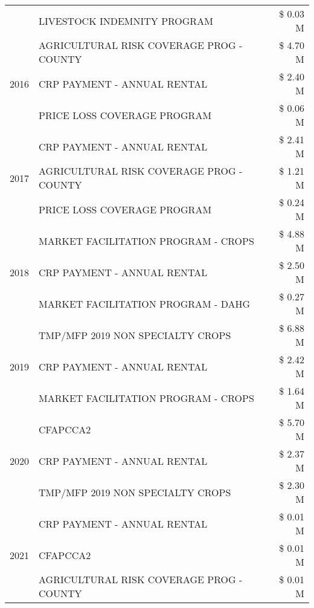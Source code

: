 \begin{tabular}{llr}
 & LIVESTOCK INDEMNITY PROGRAM & \$ 0.03 M \\
\cline{1-3}
\multirow[t]{3}{*}{2016} & AGRICULTURAL RISK COVERAGE PROG - COUNTY & \$ 4.70 M \\
 & CRP PAYMENT - ANNUAL RENTAL & \$ 2.40 M \\
 & PRICE LOSS COVERAGE PROGRAM & \$ 0.06 M \\
\cline{1-3}
\multirow[t]{3}{*}{2017} & CRP PAYMENT - ANNUAL RENTAL & \$ 2.41 M \\
 & AGRICULTURAL RISK COVERAGE PROG - COUNTY & \$ 1.21 M \\
 & PRICE LOSS COVERAGE PROGRAM & \$ 0.24 M \\
\cline{1-3}
\multirow[t]{3}{*}{2018} & MARKET FACILITATION PROGRAM - CROPS & \$ 4.88 M \\
 & CRP PAYMENT - ANNUAL RENTAL & \$ 2.50 M \\
 & MARKET FACILITATION PROGRAM - DAHG & \$ 0.27 M \\
\cline{1-3}
\multirow[t]{3}{*}{2019} & TMP/MFP 2019 NON SPECIALTY CROPS & \$ 6.88 M \\
 & CRP PAYMENT - ANNUAL RENTAL & \$ 2.42 M \\
 & MARKET FACILITATION PROGRAM - CROPS & \$ 1.64 M \\
\cline{1-3}
\multirow[t]{3}{*}{2020} & CFAPCCA2 & \$ 5.70 M \\
 & CRP PAYMENT - ANNUAL RENTAL & \$ 2.37 M \\
 & TMP/MFP 2019 NON SPECIALTY CROPS & \$ 2.30 M \\
\cline{1-3}
\multirow[t]{3}{*}{2021} & CRP PAYMENT - ANNUAL RENTAL & \$ 0.01 M \\
 & CFAPCCA2 & \$ 0.01 M \\
 & AGRICULTURAL RISK COVERAGE PROG - COUNTY & \$ 0.01 M \\
\cline{1-3}
\bottomrule
\end{tabular}
